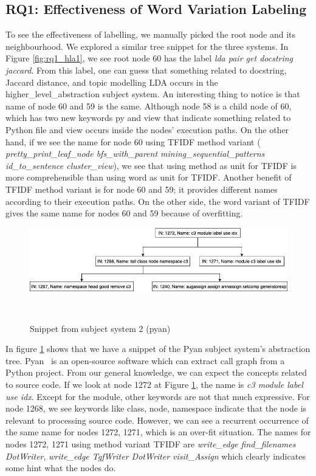 \subsection{ RQ1: Effectiveness of Word Variation Labeling}
To see the effectiveness of labelling, we manually picked the root node and its neighbourhood. We explored a similar tree snippet for the three systems. In Figure \ref{fig:rq1_hla1}, we see root node 60 has the label \textit{lda pair get docstring jaccard}. From this label, one can guess that something related to docstring, Jaccard distance, and topic modelling LDA occurs in the higher\_level\_abstraction subject system. An interesting thing to notice is that name of node 60 and 59 is the same. Although node 58 is a child node of 60, which has two new keywords py and view that indicate something related to Python file and view occurs inside the nodes' execution paths. On the other hand, if we see the name for node 60 using TFIDF method variant ( \textit{pretty\_print\_leaf\_node bfs\_with\_parent mining\_sequential\_patterns id\_to\_sentence cluster\_view}), we see that using method as unit for TFIDF is more comprehensible than using word as unit for TFIDF. Another benefit of TFIDF method variant is for node 60 and 59; it provides different names according to their execution paths. On the other side, the word variant of TFIDF gives the same name for nodes 60 and 59 because of over\-fitting.

\begin{figure}[tb]
  \centering
  \includegraphics[width=\columnwidth]{figures/hla2/rq1_pyan1.png}
  \caption{Snippet from subject system 2 (pyan)}~\label{fig:rq1_pyan1}
\end{figure}

In figure \ref{fig:rq1_pyan1} shows that we have a snippet of the Pyan subject system's abstraction tree. Pyan~\cite{pyan} is an open-source software which can extract call graph from a Python project. From our general knowledge, we can expect the concepts related to source code. If we look at node 1272 at Figure \ref{fig:rq1_pyan1}, the name is \textit{c3 module label use idx}. Except for the module, other keywords are not that much expressive. For node 1268, we see keywords like class, node, namespace indicate that the node is relevant to processing source code. However, we can see a recurrent occurrence of the same name for nodes 1272, 1271, which is an over-fit situation. The names for nodes 1272, 1271 using method variant TFIDF are \textit{write\_edge  find\_filenames  DotWriter}, \textit{write\_edge TgfWriter DotWriter visit\_Assign}  which clearly indicates some hint what the nodes do. 

